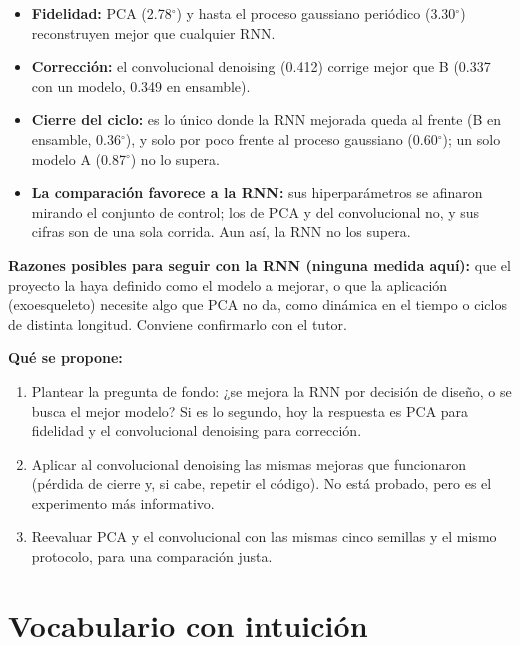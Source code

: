 \documentclass[11pt,a4paper]{article}
\newcommand{\gr}{$^\circ$}
\begin{document}
\begin{cuidado}
\begin{itemize}
\item \textbf{Fidelidad:} PCA (2.78\gr) y hasta el proceso gaussiano periódico (3.30\gr) reconstruyen mejor que cualquier RNN.
\item \textbf{Corrección:} el convolucional denoising (0.412) corrige mejor que B (0.337 con un modelo, 0.349 en ensamble).
\item \textbf{Cierre del ciclo:} es lo único donde la RNN mejorada queda al frente (B en ensamble, 0.36\gr), y solo por poco frente al proceso gaussiano (0.60\gr); un solo modelo A (0.87\gr) no lo supera.
\item \textbf{La comparación favorece a la RNN:} sus hiperparámetros se afinaron mirando el conjunto de control; los de PCA y del convolucional no, y sus cifras son de una sola corrida. Aun así, la RNN no los supera.
\end{itemize}
\end{cuidado}

\textbf{Razones posibles para seguir con la RNN (ninguna medida aquí):} que el proyecto la haya definido como el modelo a mejorar, o que la aplicación (exoesqueleto) necesite algo que PCA no da, como dinámica en el tiempo o ciclos de distinta longitud. Conviene confirmarlo con el tutor.

\textbf{Qué se propone:}
\begin{enumerate}
\item Plantear la pregunta de fondo: ¿se mejora la RNN por decisión de diseño, o se busca el mejor modelo? Si es lo segundo, hoy la respuesta es PCA para fidelidad y el convolucional denoising para corrección.
\item Aplicar al convolucional denoising las mismas mejoras que funcionaron (pérdida de cierre y, si cabe, repetir el código). No está probado, pero es el experimento más informativo.
\item Reevaluar PCA y el convolucional con las mismas cinco semillas y el mismo protocolo, para una comparación justa.
\end{enumerate}

\section{Vocabulario con intuición}
\end{document}
